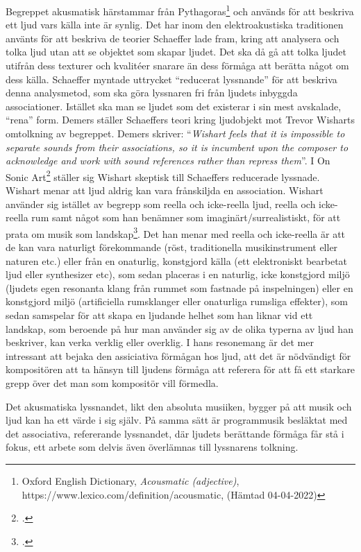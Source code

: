 \documentclass{article}
\begin{document}
Begreppet akusmatisk härstammar från Pythagoras\footnote{Oxford English Dictionary, \emph{Acousmatic (adjective)}, https://www.lexico.com/definition/acousmatic, (Hämtad 04-04-2022)} och används för att beskriva
ett ljud vars källa inte är synlig. Det har inom den elektroakustiska traditionen använts för att beskriva de
teorier Schaeffer lade fram, kring att analysera och tolka ljud utan att se objektet som skapar ljudet.
Det ska då gå att tolka ljudet utifrån dess texturer och kvalitéer snarare än dess förmåga att berätta något om dess
källa. Schaeffer myntade uttrycket ``reducerat lyssnande'' för att beskriva denna analysmetod, som ska göra
lyssnaren fri från ljudets inbyggda associationer. Istället ska man se ljudet som det existerar i sin mest
avskalade, ``rena'' form. Demers ställer Schaeffers teori kring ljudobjekt mot Trevor Wisharts omtolkning av
begreppet. Demers skriver: ``\emph{Wishart feels that it is impossible to separate sounds from their
associations, so it is incumbent upon the composer to acknowledge and work with sound references rather than
repress them}''. I On Sonic Art\footcite{TrevorWishart} ställer sig Wishart skeptisk till Schaeffers reducerade lyssnade. Wishart menar att ljud aldrig kan
vara frånskiljda en association.
Wishart använder sig istället av begrepp som reella och
icke-reella ljud, reella och icke-reella rum samt något som han benämner som imaginärt/surrealistiskt, för att
prata om musik som landskap\footcite[144-147]{TrevorWishart}. Det han menar med reella och icke-reella
är att de kan vara naturligt förekommande (röst, traditionella musikinstrument eller naturen etc.) eller från
en onaturlig, konstgjord källa (ett elektroniskt bearbetat ljud eller synthesizer etc), som sedan placeras i
en naturlig, icke konstgjord miljö (ljudets egen resonanta klang från rummet som fastnade på inspelningen)
eller en konstgjord miljö (artificiella rumsklanger eller onaturliga rumsliga effekter), som sedan samspelar
för att skapa en ljudande helhet som han liknar vid ett landskap, som beroende på hur man använder sig av de
olika typerna av ljud han beskriver, kan verka verklig eller overklig. I hans resonemang är det mer intressant
att bejaka den assiciativa förmågan hos ljud, att det är nödvändigt för kompositören att ta hänsyn till ljudens förmåga att referera för att få ett starkare grepp över det man som kompositör vill
förmedla. 

Det akusmatiska lyssnandet, likt den absoluta musiiken, bygger på att musik och ljud kan ha ett värde i sig
själv. 
På samma sätt är programmusik besläktat med det associativa, refererande lyssnandet, där ljudets berättande
förmåga får stå i fokus, ett arbete som delvis även överlämnas till lyssnarens tolkning.
\end{document}
